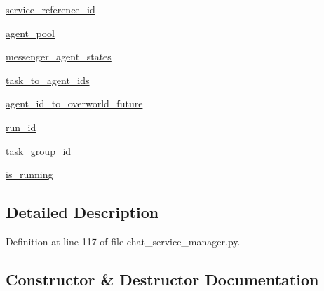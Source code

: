 \begin{DoxyCompactItemize}
\hyperlink{classparlai_1_1chat__service_1_1core_1_1chat__service__manager_1_1ChatServiceManager_a478ea28f63025fc186390230b3bbc65a}{service\+\_\+reference\+\_\+id}
\item 
\hyperlink{classparlai_1_1chat__service_1_1core_1_1chat__service__manager_1_1ChatServiceManager_ab982b846a998e063c07a0edc5f8d34ef}{agent\+\_\+pool}
\item 
\hyperlink{classparlai_1_1chat__service_1_1core_1_1chat__service__manager_1_1ChatServiceManager_a1bf9066fb32ee5d49882b87f38ef1e65}{messenger\+\_\+agent\+\_\+states}
\item 
\hyperlink{classparlai_1_1chat__service_1_1core_1_1chat__service__manager_1_1ChatServiceManager_a88fb563c2ecbcc29ec35efc35243ec74}{task\+\_\+to\+\_\+agent\+\_\+ids}
\item 
\hyperlink{classparlai_1_1chat__service_1_1core_1_1chat__service__manager_1_1ChatServiceManager_a95cfe72f24052f0a7255704beb482696}{agent\+\_\+id\+\_\+to\+\_\+overworld\+\_\+future}
\item 
\hyperlink{classparlai_1_1chat__service_1_1core_1_1chat__service__manager_1_1ChatServiceManager_aa4f6b3b4880c31e8fd260a82037a6c6e}{run\+\_\+id}
\item 
\hyperlink{classparlai_1_1chat__service_1_1core_1_1chat__service__manager_1_1ChatServiceManager_a80987a1dfe80102af73854d8b4d7a692}{task\+\_\+group\+\_\+id}
\item 
\hyperlink{classparlai_1_1chat__service_1_1core_1_1chat__service__manager_1_1ChatServiceManager_ad154fa2182cccec455c370ad623dbc1b}{is\+\_\+running}
\end{DoxyCompactItemize}


\subsection{Detailed Description}


Definition at line 117 of file chat\+\_\+service\+\_\+manager.\+py.



\subsection{Constructor \& Destructor Documentation}
\mbox{\label{classparlai_1_1chat__service_1_1core_1_1chat__service__manager_1_1ChatServiceManager_ac3c5275395694d74b18ff6d6f5e61f9d}} 
